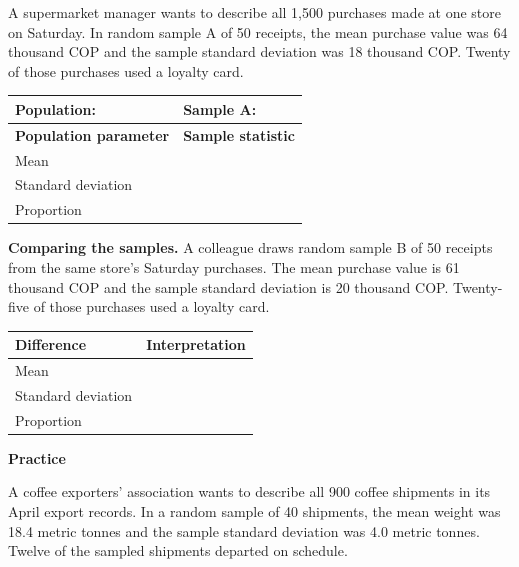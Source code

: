 \medskip
\noindent
\begin{minipage}[t]{0.48\linewidth}
	A supermarket manager wants to describe all 1,500 purchases made at one store
	on Saturday. In random sample A of 50 receipts, the mean purchase value was
	64 thousand COP and the sample standard deviation was 18 thousand COP.
	Twenty of those purchases used a loyalty card.
	
	\begin{tabularx}{\linewidth}{|L|L|}
		\hline
		\textbf{Population:} & \textbf{Sample A:} \\[1em] \hline
		\textbf{Population parameter} & \textbf{Sample statistic} \\ \hline
		Mean & \\[1em] \hline
		Standard deviation & \\[1em] \hline
		Proportion & \\[1em] \hline
	\end{tabularx}
\end{minipage}
\hfill
\begin{minipage}[t]{0.48\linewidth}
	\vspace{0pt}
	\textbf{Comparing the samples.}
	A colleague draws random sample B of 50 receipts from the same
	store's Saturday purchases. The mean purchase value is 61 thousand COP and
	the sample standard deviation is 20 thousand COP. Twenty-five of those
	purchases used a loyalty card.
	
	\smallskip
	\begin{tabularx}{\linewidth}{|L|L|}
		\hline
		\textbf{Difference} & \textbf{Interpretation} \\ \hline
		Mean & \\[1.5em] \hline
		Standard deviation & \\[1.5em] \hline
		Proportion & \\[1.5em] \hline
	\end{tabularx}
\end{minipage}

\begin{center}
		\vspace{-3mm}
	\textbf{Practice}
	\vspace{-8mm}
\end{center}

A coffee exporters' association wants to describe all 900 coffee shipments
in its April export records. In a random sample of 40 shipments, the mean
weight was 18.4 metric tonnes and the sample standard deviation was 4.0 metric
tonnes. Twelve of the sampled shipments departed on schedule.

